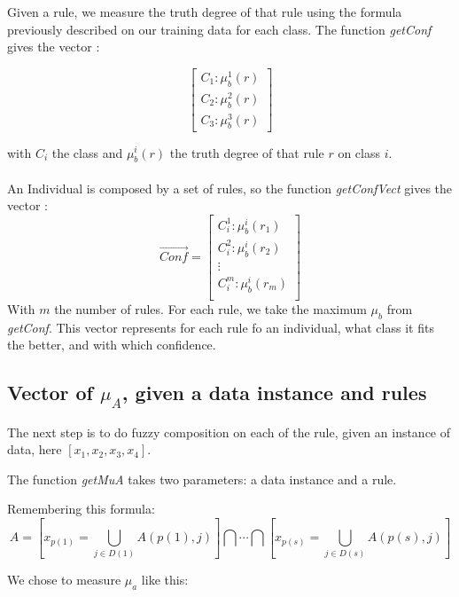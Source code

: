 \documentclass[a4paper,12pt]{article}
\begin{document}
Given a rule, we measure the truth degree of that rule using the formula previously described on our training data for each class.
The function \textit{getConf} gives the vector :

\[
\begin{bmatrix}
C_1:\mu_b^1(r)\\
C_2:\mu_b^2(r)\\
C_3:\mu_b^3(r)
\end{bmatrix} \]

with $C_i$ the class and $\mu_b^i(r)$ the truth degree of that rule $r$ on class $i$.
\\
\\
An Individual is composed by a set of rules, so the function \textit{getConfVect} gives the vector :
\[
\vec{Conf}=
\begin{bmatrix}
C_i^1:\mu_b^i(r_1)\\
C_i^2:\mu_b^i(r_2)\\
\vdots\\
C_i^m:\mu_b^i(r_m)\\
\end{bmatrix} \]
With $m$ the number of rules. For each rule, we take the maximum $\mu_b$ from \textit{getConf}. This vector represents for each rule fo an individual, what class it fits the better, and with which confidence.

\subsection{Vector of $\mu_A$, given a data instance and rules}

The next step is to do fuzzy composition on each of the rule, given an instance of data, here $[x_1,x_2,x_3,x_4]$.

The function \textit{getMuA} takes two parameters: a data instance and a rule.

Remembering this formula:
\[A=[x_{p(1)}=\bigcup_{j\in D(1)}A(p(1),j) ] \bigcap\cdots\bigcap[x_{p(s)}=\bigcup_{j\in D(s)}A(p(s),j)]\]

We chose to measure $\mu_a$ like this:
\end{document}
